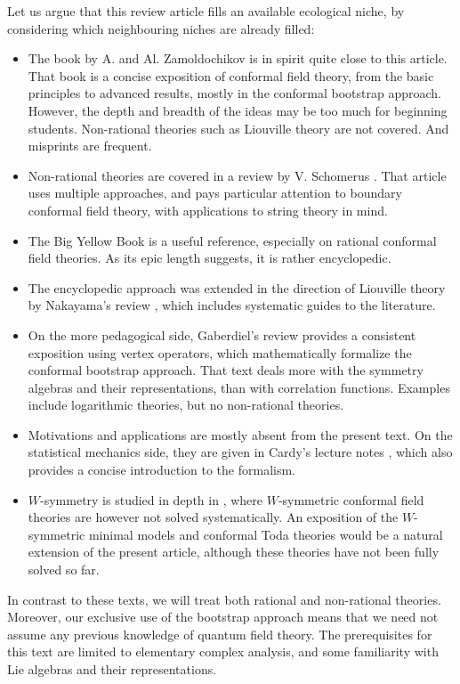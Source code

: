 \documentclass[12pt,a4paper,notitlepage]{report}
\numberwithin{equation}{section}
\theoremstyle{break}
\begin{document}
Let us argue that this review article fills an available ecological niche, by considering which neighbouring niches are already filled: 
\begin{itemize}
\item 
The book \cite{zz90} by A. and Al. Zamoldochikov is in spirit quite close to this article. That book is a concise exposition of conformal field theory, from the basic principles to advanced results, mostly in the conformal bootstrap approach. However, the depth and breadth of the ideas may be too much for beginning students. Non-rational theories such as Liouville theory are not covered. And misprints are frequent.
\item
Non-rational theories are covered in a review by V. Schomerus \cite{sch05}. That article uses multiple approaches, and pays particular attention to boundary conformal field theory, with applications to string theory in mind. 
\item
The Big Yellow Book \cite{fms97} is a useful reference, especially on rational conformal field theories. As its epic length suggests, it is rather encyclopedic. 
\item
The encyclopedic approach was extended in the direction of Liouville theory by Nakayama's review \cite{nak04}, which includes systematic guides to the literature.
\item 
On the more pedagogical side, Gaberdiel's review \cite{gab99} provides a consistent exposition using vertex operators, which mathematically formalize the conformal bootstrap approach. That text deals more with the symmetry algebras and their representations, than with correlation functions. Examples include logarithmic theories, but no non-rational theories.
\item
Motivations and applications are mostly absent from the present text. On the statistical mechanics side, they are given in Cardy's lecture notes \cite{car08}, which also provides a concise introduction to the formalism.
\item 
$W$-symmetry is studied in depth in \cite{bs92}, where $W$-symmetric conformal field theories are however not solved systematically. An exposition of the $W$-symmetric minimal models and conformal Toda theories would be a natural extension of the present article, although these theories have not been fully solved so far. 
\end{itemize}
In contrast to these texts, we will treat both rational and non-rational theories. Moreover, our exclusive use of the bootstrap approach means that we need not assume any previous knowledge of quantum field theory. The prerequisites for this text are limited to 
elementary complex analysis, and some familiarity with Lie algebras and their representations.
\end{document}
